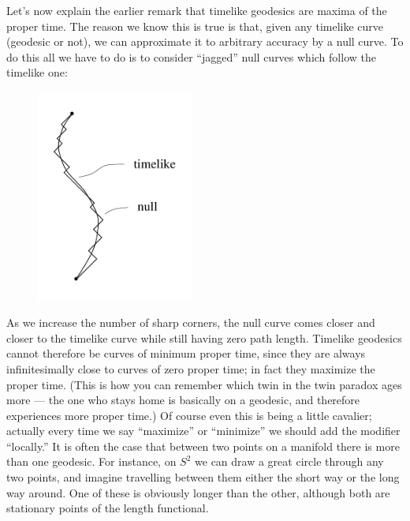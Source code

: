 \documentclass[12pt]{article}
\begin{document}
Let's now explain the earlier remark that timelike geodesics are
maxima of the proper time.  The reason we know this is true is
that, given any timelike curve (geodesic or not), we can approximate
it to arbitrary accuracy by a null curve.  To do this all we have
to do is to consider ``jagged'' null curves which follow the
timelike one:

\eject

\begin{figure}[h]
  \centerline{
  \includegraphics[height=7cm]{pdf/three5}}
\end{figure}

\noindent As we increase the number of sharp corners, the null curve
comes closer and closer to the timelike curve while still having
zero path length.  Timelike geodesics cannot therefore be curves
of minimum proper time, since they are always infinitesimally close
to curves of zero proper time; in fact they maximize the proper time.
(This is how you can remember which twin in the twin paradox ages
more --- the one who stays home is basically on a geodesic, and
therefore experiences more proper time.)  Of course even this is
being a little cavalier; actually every time we say ``maximize''
or ``minimize'' we should add the modifier ``locally.''  It is often
the case that between two points on a manifold there is more than
one geodesic.  For instance, on $S^2$ we can draw a great circle 
through any two points, and imagine travelling between them either 
the short way or the long way around.
One of these is obviously longer than the other, although
both are stationary points of the length functional.
\end{document}
